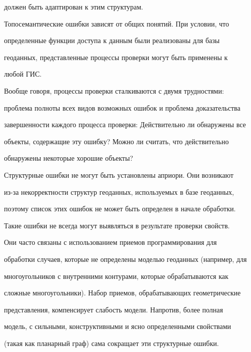 должен быть адаптирован к этим структурам. 


    


    Топосемантические ошибки зависят от общих понятий. При условии, что 


определенные функции доступа к данным были реализованы для базы 


геоданных, представленные процессы проверки могут быть применены к 


любой ГИС. 


    


    Вообще говоря, процессы проверки сталкиваются с двумя трудностями: 


проблема полноты всех видов возможных ошибок и проблема доказательства 


завершенности каждого процесса проверки: Действительно ли обнаружены все  


объекты, содержащие эту ошибку? Можно ли считать, что действительно 


обнаружены  некоторые хорошие объекты? 


    


    Структурные ошибки не могут быть установлены априори. Они возникают 


из-за некорректности структур геоданных, используемых в базе геоданных, 


поэтому список этих ошибок не может быть определен в начале обработки. 


    


    Такие ошибки не всегда могут выявляться в результате проверки свойств. 


Они часто связаны с использованием приемов программирования для 


обработки случаев, которые не определены моделью геоданных (например, для 


многоугольников с внутренними контурами, которые обрабатываются как 


сложные многоугольники). Набор приемов, обрабатывающих геометрические 


представления, компенсирует слабость модели. Напротив, более полная 


модель, с сильными, конструктивными и ясно определенными свойствами 


(такая как планарный граф) сама сокращает эти структурные ошибки. 


